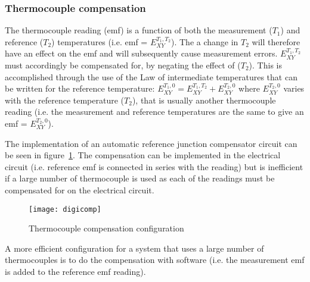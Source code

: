 \subsubsection{Thermocouple compensation}
The thermocouple reading (emf) is a function of both the measurement ($T_1$) and reference ($T_2$) temperatures (i.e. emf = $E_{XY}^{T_1 , T_2}$). The a change in $T_2$ will therefore have an effect on the emf and will subsequently cause measurement errors. $E_{XY}^{T_1 , T_2}$ must accordingly be compensated for, by negating the effect of ($T_2$). This is accomplished through the use of the Law of intermediate
temperatures that can be written for the reference temperature:
 	\(E_{XY}^{T_1 , 0} = E_{XY}^{T_1 , T_2} + E_{XY}^{T_2 , 0}\)
where $E_{XY}^{T_2 , 0}$ varies with the reference temperature ($T_2$), that is usually another thermocouple reading (i.e. the measurement and reference temperatures are the same to give an emf = $E_{XY}^{T_2 , 0}$).

The implementation of an automatic reference junction compensator circuit can be seen in figure~\ref{fig:digi:comp}. The compensation can be implemented in the electrical circuit (i.e. reference emf is connected in series with the reading) but is inefficient if a large number of thermocouple is used as each of the readings must be compensated for on the electrical circuit. 
\begin{figure}[htbp]
	\centering
	\texttt{[image: digicomp]}
	\caption{Thermocouple compensation configuration}
	\label{fig:digi:comp}
\end{figure}
A more efficient configuration for a system that uses a large number of thermocouples is to do the compensation with software (i.e. the measurement emf is added to the reference emf reading).
   

